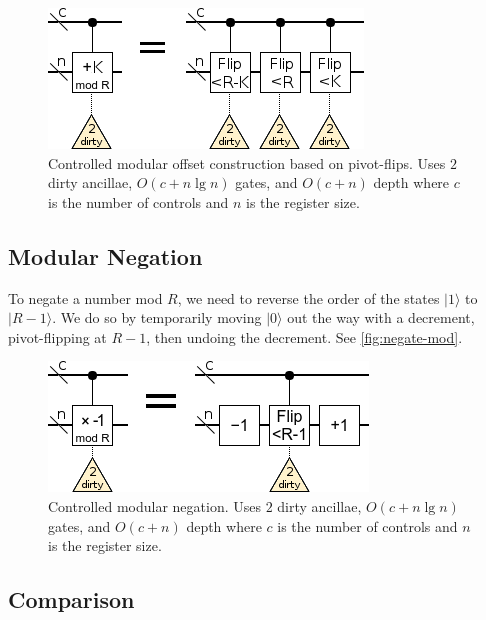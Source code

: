 \documentclass[twocolumn,longbibliography]{quantumarticle}
\begin{document}
\begin{figure}
  \centering
  \includegraphics[width=\linewidth]{assets/controlled-modular-offset.png}
  \caption{
    Controlled modular offset construction based on pivot-flips.
    Uses $2$ dirty ancillae, $O(c + n \lg n)$ gates, and $O(c + n)$ depth where $c$ is the number of controls and $n$ is the register size.
  }
  \label{fig:controlled-modular-offset}
\end{figure}


\subsection{Modular Negation}

To negate a number mod $R$, we need to reverse the order of the states $|1\rangle$ to $|R-1\rangle$.
We do so by temporarily moving $|0\rangle$ out the way with a decrement, pivot-flipping at $R-1$, then undoing the decrement.
See \autoref{fig:negate-mod}.

\begin{figure}
  \centering
  \includegraphics[width=\linewidth]{assets/negate-mod.png}
  \caption{
    Controlled modular negation.
    Uses $2$ dirty ancillae, $O(c + n \lg n)$ gates, and $O(c + n)$ depth where $c$ is the number of controls and $n$ is the register size.
  }
  \label{fig:negate-mod}
\end{figure}


\subsection{Comparison}
\end{document}
